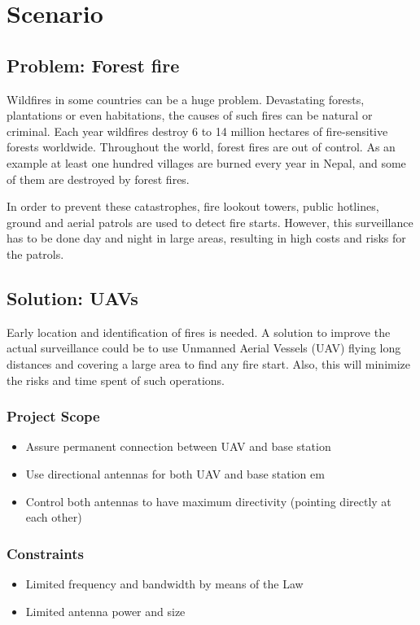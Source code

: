 \chapter{Scenario}\label{ch:scenario}

\section{Problem: Forest fire}
Wildfires in some countries can be a huge problem. Devastating forests, plantations or even habitations, the causes of such fires can be natural or criminal.
Each year wildfires destroy 6 to 14 million hectares of fire-sensitive forests worldwide. Throughout the world, forest fires are out of control. As an example at least one hundred villages are burned every year in Nepal, and some of them are destroyed by forest fires.

In order to prevent these catastrophes, fire lookout towers, public hotlines, ground and aerial patrols are used to detect fire starts. However, this surveillance has to be done day and night in large areas, resulting in high costs and risks for the patrols.

\section{Solution: UAVs}
Early location and identification of fires is needed. A solution to improve the actual surveillance could be to use Unmanned Aerial Vessels (UAV) flying long distances and covering a large area to find any fire start. Also, this will minimize the risks and time spent of such operations. 

\subsection*{Project Scope}
\begin{itemize}  
        \item{Assure permanent connection between UAV and base station}
        \item Use directional antennas for both UAV and base station em 
        \item Control both antennas to have maximum directivity (pointing directly at each other)
\end{itemize}

\subsection*{Constraints}
\begin{itemize}  
        \item{Limited frequency and bandwidth by means of the Law}
        \item{Limited antenna power and size}
\end{itemize}

